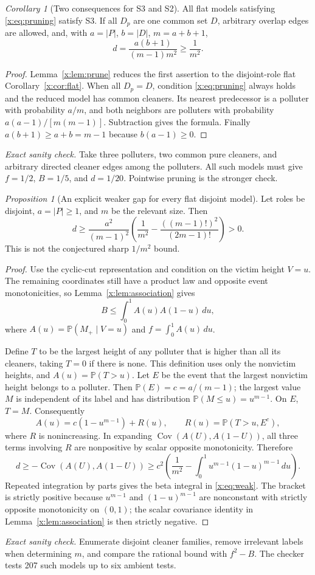 \documentclass[11pt,a4paper]{article}
\theoremstyle{definition}\newtheorem{definition}[theorem]{Definition}
\theoremstyle{remark}\newtheorem{remark}[theorem]{Remark}
\newtheorem{xproposition}[xtheorem]{Proposition}
\newtheorem{xcorollary}[xtheorem]{Corollary}
\theoremstyle{definition}\newtheorem{xexample}[xtheorem]{Example}\theoremstyle{plain}
\newcommand{\PP}{\mathbb P}\newcommand{\EE}{\mathbb E}\newcommand{\Cov}{\operatorname{Cov}}
\newcommand{\xcheck}[1]{\par\smallskip\textit{Exact sanity check.} #1\par}
\begin{document}
\begin{xcorollary}[Two consequences for S3 and S2]\label{x:cor:prune}
All flat models satisfying \eqref{x:eq:pruning} satisfy S3. If all $D_p$ are one common set $D$, arbitrary overlap edges are allowed, and, with $a=|P|$, $b=|D|$, $m=a+b+1$,
\[
d=\frac{a(b+1)}{(m-1)m^2}\ge\frac1{m^2}.
\]
\end{xcorollary}
\begin{proof}
Lemma~\ref{x:lem:prune} reduces the first assertion to the disjoint-role flat Corollary~\ref{x:cor:flat}. When all $D_p=D$, condition \eqref{x:eq:pruning} always holds and the reduced model has common cleaners. Its nearest predecessor is a polluter with probability $a/m$, and both neighbors are polluters with probability $a(a-1)/[m(m-1)]$. Subtraction gives the formula. Finally $a(b+1)\ge a+b=m-1$ because $b(a-1)\ge0$.
\end{proof}
\xcheck{Take three polluters, two common pure cleaners, and arbitrary directed cleaner edges among the polluters. All such models must give $f=1/2$, $B=1/5$, and $d=1/20$. Pointwise pruning is the stronger check.}

\begin{xproposition}[An explicit weaker gap for every flat disjoint model]\label{x:prop:weak}
Let roles be disjoint, $a=|P|\ge1$, and $m$ be the relevant size. Then
\begin{equation}\label{x:eq:weak}
\boxed{d\ge\frac{a^2}{(m-1)^2}
\left(\frac1{m^2}-\frac{((m-1)!)^2}{(2m-1)!}\right)>0.}
\end{equation}
This is not the conjectured sharp $1/m^2$ bound.
\end{xproposition}
\begin{proof}
Use the cyclic-cut representation and condition on the victim height $V=u$. The remaining coordinates still have a product law and opposite event monotonicities, so Lemma~\ref{x:lem:association} gives
\[
B\le\int_0^1 A(u)A(1-u)\,du,
\]
where $A(u)=\PP(M_+\mid V=u)$ and $f=\int_0^1A(u)\,du$.

Define $T$ to be the largest height of any polluter that is higher than all its cleaners, taking $T=0$ if there is none. This definition uses only the nonvictim heights, and $A(u)=\PP(T>u)$. Let $E$ be the event that the largest nonvictim height belongs to a polluter. Then $\PP(E)=c=a/(m-1)$; the largest value $M$ is independent of its label and has distribution $\PP(M\le u)=u^{m-1}$. On $E$, $T=M$. Consequently
\[
A(u)=c(1-u^{m-1})+R(u),\qquad R(u)=\PP(T>u,E^c),
\]
where $R$ is nonincreasing. In expanding $\Cov(A(U),A(1-U))$, all three terms involving $R$ are nonpositive by scalar opposite monotonicity. Therefore
\[
d\ge-\Cov(A(U),A(1-U))
\ge c^2\left(\frac1{m^2}-\int_0^1u^{m-1}(1-u)^{m-1}\,du\right).
\]
Repeated integration by parts gives the beta integral in \eqref{x:eq:weak}. The bracket is strictly positive because $u^{m-1}$ and $(1-u)^{m-1}$ are nonconstant with strictly opposite monotonicity on $(0,1)$; the scalar covariance identity in Lemma~\ref{x:lem:association} is then strictly negative.
\end{proof}
\xcheck{Enumerate disjoint cleaner families, remove irrelevant labels when determining $m$, and compare the rational bound with $f^2-B$. The checker tests 207 such models up to six ambient tests.}
\end{document}
